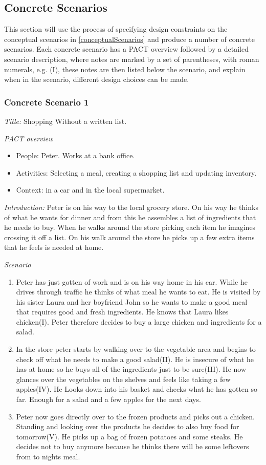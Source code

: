 \subsection{Concrete Scenarios}\label{ConcreteScenarios}
This section will use the process of specifying design constraints on the conceptual scenarios in \cref{conceptualScenarios} and produce a number of concrete scenarios. Each concrete scenario has a PACT overview followed by a detailed scenario description, where notes are marked by a set of parentheses, with roman numerals, e.g. (I), these notes are then listed below the scenario, and explain when in the scenario, different design choices can be made.

\subsubsection{Concrete Scenario 1}\label{ConcreteScenario1}

\emph{Title:} Shopping Without a written list.

\emph{PACT overview}
\begin{itemize}
\item People: Peter. Works at a bank office.
\item Activities: Selecting a meal, creating a shopping list and updating inventory.  
\item Context: in a car and in the local supermarket.
\end{itemize}

\emph{Introduction:} Peter is on his way to the local grocery store. On his way he thinks of what he wants for dinner and from this he assembles a list of ingredients that he needs to buy. When he walks around the store picking each item he imagines crossing it off a list. On his walk around the store he picks up a few extra items that he feels is needed at home.

\emph{Scenario}
\begin{enumerate}
\item Peter has just gotten of work and is on his way home in his car. While he drives through traffic he thinks of what meal he wants to eat. He is visited by his sister Laura and her boyfriend John so he wants to make a good meal that requires good and fresh ingredients. He knows that Laura likes chicken(I). Peter therefore decides to buy a large chicken and ingredients for a salad. 
\item In the store peter starts by walking over to the vegetable area and begins to check off what he needs to make a good salad(II). He is insecure of what he has at home so he buys all of the ingredients just to be sure(III). He now glances over the vegetables on the shelves and feels like taking a few apples(IV). He Looks down into his basket and checks what he has gotten so far. Enough for a salad and a few apples for the next days.
\item Peter now goes directly over to the frozen products and picks out a chicken. Standing and looking over the products he decides to also buy food for tomorrow(V). He picks up a bag of frozen potatoes and some steaks. He decides not to buy anymore because he thinks there will be some leftovers from to nights meal.  
\end{enumerate}


